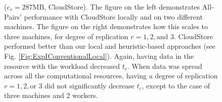 \documentclass{rspublic}
\newcommand{\fixme}[1]{ { \bf{ ***FIXME: #1
}} } \newcommand{\jhanote}[1]{ {\textcolor{red} { ***Jha: #1 }}}
\newcommand{\micnote}[1]{ {\textcolor{blue} { ***Michael: #1 }}}
\newcommand{\betynote}[1]{ {\textcolor{orange} { ***Bety: #1 }}}
\newcommand{\jhanote}[1]{} \newcommand{\micnote}[1]{}\newcommand{\betynote}[1]{} \newcommand{\fixme}[1]{}
\begin{document}
\begin{figure}
\begin{center}
\caption{($c_s = \mbox{287MB}$,  CloudStore).
The figure on the left demonstrates All-Pairs' performance
with CloudStore locally and on two different machines. The figure on the
right demonstrates how this scales to three machines, for degree of
replication $r=1,2,\mbox{and } 3$. CloudStore performed better than our
local and heuristic-based approaches (see Fig.
\ref{Fig:ExpIConventionalLocal}). Again,
having data in the resource with the workload decreased $t_c$. When data
was spread across all the computational resources, having a degree of
replication $r = 1, 2, \mbox{or } 3$ did not significantly decrease
$t_c$, except to the case of three machines and 2 workers.}
\label{Fig:experiment3}
\end{center}
\vspace{-0.3cm}
\end{figure}
\end{document}
